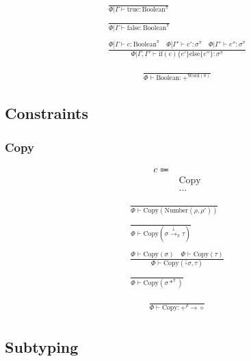 \documentclass {article}
\begin{document}
\begin{gather*}
\frac
{}
{ \Phi | \Gamma \vdash \text{true} : \text{Boolean}^\pi} \\
\\
\frac
{}
{ \Phi | \Gamma \vdash \text{false} : \text{Boolean}^\pi} \\
\\
\frac
{\Phi | \Gamma \vdash e : \text{Boolean}^\pi \quad \Phi | \Gamma' \vdash e' : \sigma^\pi \quad \Phi | \Gamma' \vdash e'' : \sigma^\pi }
{\Phi | \Gamma, \Gamma' \vdash \text{if} (e) \{ e' \} \text{else} \{ e'' \} : \sigma^\pi }
\end{gather*}

\begin{gather*}
\frac
{}
{ \Phi \vdash \text{Boolean} : +^{\text{Word}(8)}}
\end{gather*}

\subsection{Constraints}

\subsubsection{Copy}
\begin{align*}
c \Coloneqq & \\
& \text{Copy} \\
& \dots
\end{align*}

\begin{gather*}
\frac
{}
{\Phi \vdash \text{Copy} (\text{Number} (\rho, \rho'))} \\
\\
\frac
{}
{\Phi \vdash \text{Copy} (\sigma \xrightarrow{\downarrow}_\pi \tau)} \\
\\
\frac
{\Phi \vdash \text{Copy}(\sigma) \quad \Phi \vdash \text{Copy}(\tau) }
{\Phi \vdash \text{Copy} (^\downarrow \sigma, \tau ) } \\
\\
\frac
{}
{\Phi \vdash \text{Copy} (\sigma *^\pi) }
\end{gather*}

\begin{gather*}
\frac
{}
{\Phi \vdash \text{Copy} : +^{\rho} \to \diamond} \\
\end{gather*}

\subsection{Subtyping}
\end{document}
